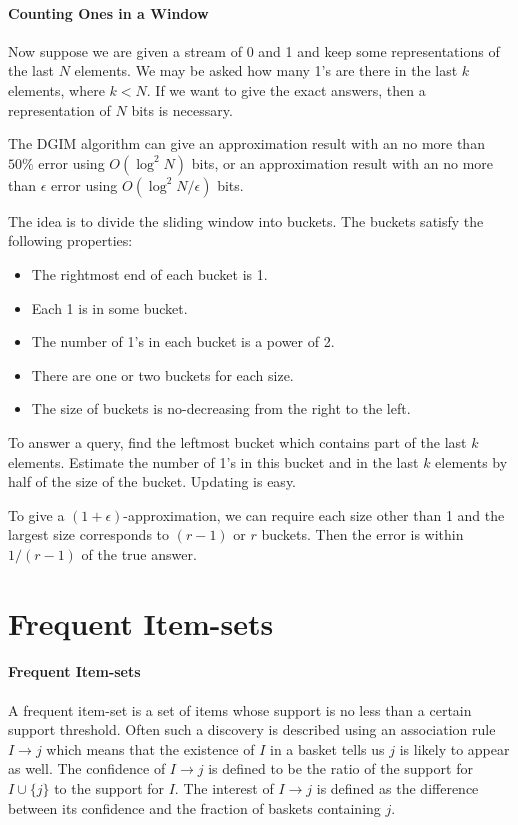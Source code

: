 \documentclass{article}
\begin{document}
\paragraph{Counting Ones in a Window}
Now suppose we are given a stream of 0 and 1 and keep some representations of the last $N$ elements. We may be asked how many 1's are there in the last $k$ elements, where $k<N$. If we want to give the exact answers, then a representation of $N$ bits is necessary.

The DGIM algorithm can give an approximation result with an no more than $50\%$ error using $O(\log^2N)$ bits, or an approximation result with an no more than $\epsilon$ error using $O(\log^2N/\epsilon)$ bits. 

The idea is to divide the sliding window into buckets. The buckets satisfy the following properties:
\begin{itemize}
\item The rightmost end of each bucket is 1.
\item Each 1 is in some bucket.
\item The number of 1's in each bucket is a power of 2.
\item There are one or two buckets for each size.
\item The size of buckets is no-decreasing from the right to the left.
\end{itemize}

To answer a query, find the leftmost bucket which contains part of the last $k$ elements. Estimate the number of 1's in this bucket and in the last $k$ elements by half of the size of the bucket. Updating is easy. 

To give a $(1+\epsilon)$-approximation, we can require each size other than 1 and the largest size corresponds to $(r-1)$ or $r$ buckets. Then the error is within $1/(r-1)$ of the true answer.


\section*{Frequent Item-sets}
\paragraph{Frequent Item-sets} 
A frequent item-set is a set of items whose support is no less than a certain support threshold. Often such a discovery is described using an association rule $I\rightarrow j$ which means that the existence of $I$ in a basket tells us $j$ is likely to appear as well. The confidence of $I\rightarrow j$ is defined to be the ratio of the support for $I\cup\{j\}$ to the support for $I$. The interest of $I\rightarrow j$ is defined as the difference between its confidence and the fraction of baskets containing $j$.
\end{document}
